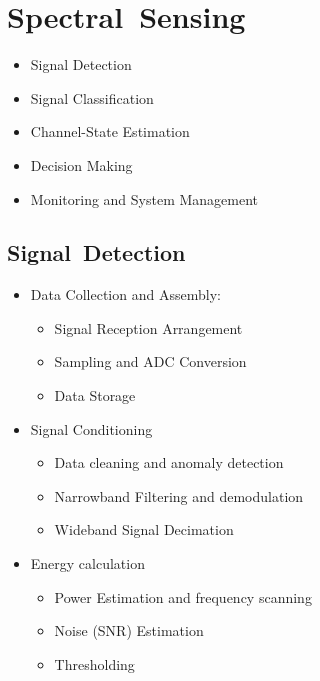 \documentclass[17pt,a4paper]{extarticle}
\begin{document}
\maketitle
\thispagestyle{fancy}
\clearpage\newpage
\section{Spectral~Sensing}
\begin{itemize}
	\item Signal Detection

	\item Signal Classification
	
	\item Channel-State Estimation
	\item Decision Making
	
	\item Monitoring and System Management
\end{itemize}
\clearpage\newpage
\subsection{Signal~Detection}
\begin{itemize}
	\item Data Collection and Assembly:
	\begin{itemize}
		\item Signal Reception Arrangement
		\item Sampling and  ADC Conversion
		\item Data Storage
 \end{itemize}
 \item Signal Conditioning
 \begin{itemize}
 		
\item Data cleaning and anomaly detection

\item Narrowband Filtering and demodulation

\item Wideband Signal Decimation
 	
 \end{itemize}
\item Energy calculation
\begin{itemize}
	\item Power Estimation and frequency scanning
	\item Noise (SNR) Estimation 
	\item Thresholding 
\end{itemize}
\end{itemize}
\clearpage\newpage
\end{document}
